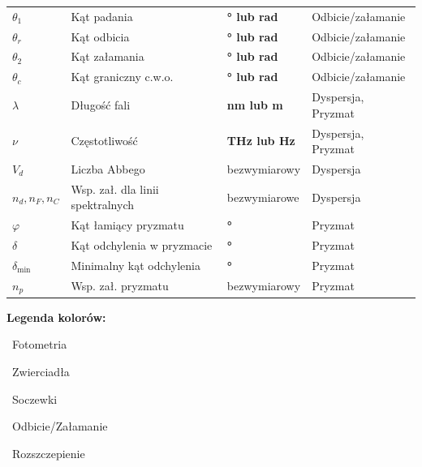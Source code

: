 \documentclass[12pt,a4paper]{article}
\begin{document}
\begin{longtable}{>{\bfseries}p{2.0cm} p{7.0cm} p{3.2cm} p{2.5cm}}
$\theta_1$     & Kąt padania      & \textbf{° lub rad}          & Odbicie/załamanie \\
\rowcolor{rowodbl}
$\theta_r$     & Kąt odbicia      & \textbf{° lub rad}          & Odbicie/załamanie \\
\rowcolor{rowodbl}
$\theta_2$     & Kąt załamania    & \textbf{° lub rad}          & Odbicie/załamanie \\
\rowcolor{rowodbl}
$\theta_c$     & Kąt graniczny c.w.o. & \textbf{° lub rad}      & Odbicie/załamanie \\
\rowcolor{rowrozs}
$\lambda$      & Długość fali     & \textbf{nm lub m}           & Dyspersja, Pryzmat \\
\rowcolor{rowrozs}
$\nu$          & Częstotliwość    & \textbf{THz lub Hz}         & Dyspersja, Pryzmat \\
\rowcolor{rowrozs}
$V_d$          & Liczba Abbego    & bezwymiarowy                & Dyspersja \\
\rowcolor{rowrozs}
$n_d, n_F, n_C$ & Wsp. zał. dla linii spektralnych & bezwymiarowe & Dyspersja \\
\rowcolor{rowrozs}
$\varphi$      & Kąt łamiący pryzmatu & \textbf{°}             & Pryzmat \\
\rowcolor{rowrozs}
$\delta$       & Kąt odchylenia w pryzmacie & \textbf{°}         & Pryzmat \\
\rowcolor{rowrozs}
$\delta_{\min}$ & Minimalny kąt odchylenia & \textbf{°}          & Pryzmat \\
\rowcolor{rowrozs}
$n_p$          & Wsp. zał. pryzmatu & bezwymiarowy              & Pryzmat \\

\end{longtable}

\bigskip
\begin{center}
  \textbf{Legenda kolorów:}
  \quad
  \colorbox{rowfoto}{\strut\ Fotometria\ }
  \quad
  \colorbox{rowzwierc}{\strut\ Zwierciadła\ }
  \quad
  \colorbox{rowsocz}{\strut\ Soczewki\ }
  \quad
  \colorbox{rowodbl}{\strut\ Odbicie/Załamanie\ }
  \quad
  \colorbox{rowrozs}{\strut\ Rozszczepienie\ }
\end{center}
\end{document}
